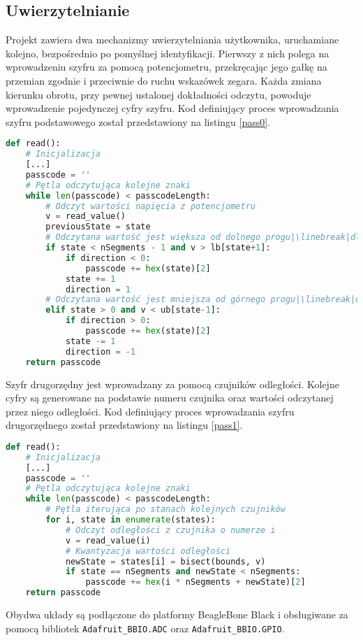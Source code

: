 \documentclass[polish,polish,a4paper]{article}
\begin{document}
	\subsection{Uwierzytelnianie}
	Projekt zawiera dwa mechanizmy uwierzytelniania użytkownika, uruchamiane kolejno, bezpośrednio po pomyślnej identyfikacji. Pierwszy z nich polega na wprowadzeniu szyfru za pomocą potencjometru, przekręcając jego gałkę na przemian zgodnie i przeciwnie do ruchu wskazówek zegara. Każda zmiana kierunku obrotu, przy pewnej ustalonej dokładności odczytu, powoduje wprowadzenie pojedynczej cyfry szyfru. Kod definiujący proces wprowadzania szyfru podstawowego został przedstawiony na listingu \ref{pass0}.
	\begin{lstlisting}[language=Python, caption={Fragment kodu sterującego wprowadzaniem szyfru podstawowego}, label=pass0]
def read():
	# Inicjalizacja
	[...]
	passcode = ''
	# Pętla odczytująca kolejne znaki
	while len(passcode) < passcodeLength:
		# Odczyt wartości napięcia z potencjometru
		v = read_value()
		previousState = state
		# Odczytana wartość jest większa od dolnego progu|\linebreak|dla cyfry większej o 1
		if state < nSegments - 1 and v > lb[state+1]:
			if direction < 0:
				passcode += hex(state)[2]
			state += 1
			direction = 1
		# Odczytana wartość jest mniejsza od górnego progu|\linebreak|dla cyfry mniejszej o 1
		elif state > 0 and v < ub[state-1]:
			if direction > 0:
				passcode += hex(state)[2]
			state -= 1
			direction = -1
	return passcode
	\end{lstlisting}
	Szyfr drugorzędny jest wprowadzany za pomocą czujników odległości. Kolejne cyfry są generowane na podstawie numeru czujnika oraz wartości odczytanej przez niego odległości. Kod definiujący proces wprowadzania szyfru drugorzędnego został przedstawiony na listingu \ref{pass1}.
	\begin{lstlisting}[language=Python, caption={Fragment kodu sterującego wprowadzaniem szyfru drugorzędnego}, label=pass1]
def read():
	# Inicjalizacja
	[...]
	passcode = ''
	# Pętla odczytująca kolejne znaki
	while len(passcode) < passcodeLength:
		# Pętla iterująca po stanach kolejnych czujników
		for i, state in enumerate(states):
			# Odczyt odległości z czujnika o numerze i
			v = read_value(i)
			# Kwantyzacja wartości odległości
			newState = states[i] = bisect(bounds, v)
			if state == nSegments and newState < nSegments:
				passcode += hex(i * nSegments + newState)[2]
	return passcode
	\end{lstlisting}
	Obydwa układy są podłączone do platformy BeagleBone Black i obsługiwane za pomocą bibliotek \linebreak\verb|Adafruit_BBIO.ADC| oraz \verb|Adafruit_BBIO.GPIO|.
	
\end{document}
